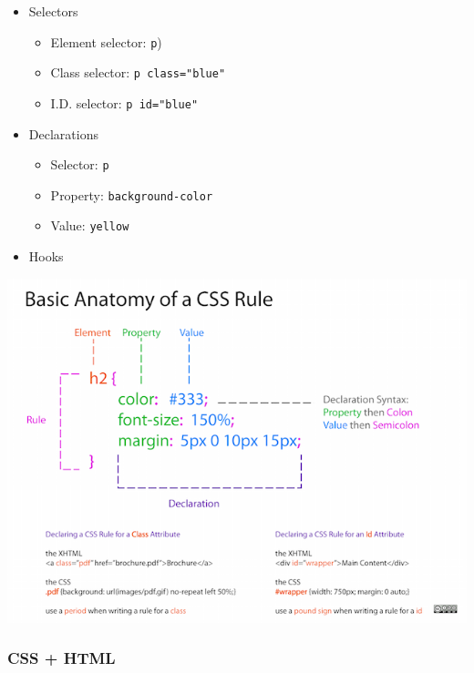 \documentclass[]{book}
\providecommand{\tightlist}{%
  \setlength{\itemsep}{0pt}\setlength{\parskip}{0pt}}
\begin{document}
\begin{itemize}
\tightlist
\item
  Selectors

  \begin{itemize}
  \tightlist
  \item
    Element selector: \texttt{p})
  \item
    Class selector: \texttt{p\ class="blue"}
  \item
    I.D. selector: \texttt{p\ id="blue"}
  \end{itemize}
\item
  Declarations

  \begin{itemize}
  \tightlist
  \item
    Selector: \texttt{p}
  \item
    Property: \texttt{background-color}
  \item
    Value: \texttt{yellow}
  \end{itemize}
\item
  Hooks
\end{itemize}

\begin{center}\includegraphics[width=0.7\linewidth]{img/css-rule-2} \end{center}

\subsubsection{CSS + HTML}\label{css-html}
\end{document}
